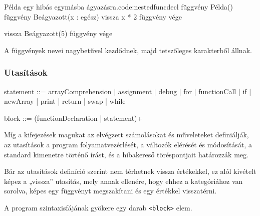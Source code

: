 \begin{code}{Példa egy hibás egymásba ágyazásra.}{code:nestedfuncdecl}
függvény Példa()
    függvény Beágyazott(x : egész)
        vissza x * 2
    függvény vége

    vissza Beágyazott(5)
függvény vége
\end{code}

A függvények nevei nagybetűvel kezdődnek, majd tetszőleges karakterből állnak.

\subsubsection{Utasítások}

\begin{ebnf}
statement ::= arrayComprehension 
    | assignment 
    | debug 
    | for 
    | functionCall 
    | if 
    | newArray 
    | print 
    | return 
    | swap 
    | while

block ::= (functionDeclaration | statement)+
\end{ebnf}

Míg a kifejezések magukat az elvégzett számolásokat és műveleteket definiálják, az utasítások a program folyamatvezérlését, a változók elérését és módosítását, a standard kimenetre történő írást, és a hibakereső töréspontjait határozzák meg.

Bár az utasítások definíció szerint nem térhetnek vissza értékekkel, ez alól kivételt képez a „vissza” utasítás, mely annak ellenére, hogy ehhez a kategóriához van sorolva, képes egy függvényt megszakítani és egy értékkel visszatérni.

A program szintaxisfájának gyökere egy darab \texttt{<block>} elem.